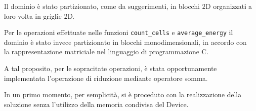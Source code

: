 Il dominio è stato partizionato, come da suggerimenti, in blocchi 2D organizzati
a loro volta in griglie 2D.

Per le operazioni effettuate nelle funzioni \texttt{count\_cells} e
\texttt{average\_energy} il dominio è stato invece partizionato in blocchi
monodimensionali, in accordo con la rappresentazione matriciale nel linguaggio
di programmazione C.

A tal proposito, per le sopracitate operazioni, è stata opportunamente
implementata l'operazione di riduzione mediante operatore somma.

In un primo momento, per semplicità, si è proceduto con la realizzazione della
soluzione senza l'utilizzo della memoria condivisa del Device.
